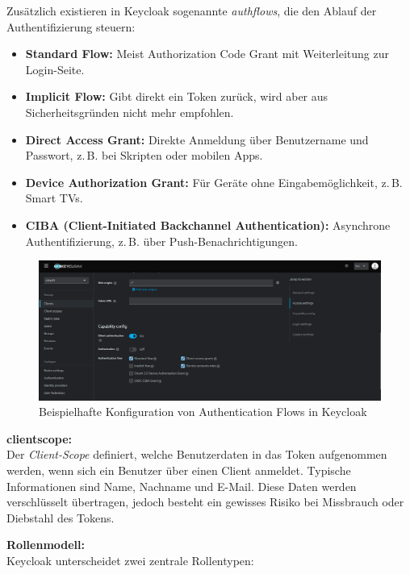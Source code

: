 \documentclass[a4paper,12pt]{article}
\begin{document}
	Zusätzlich existieren in Keycloak sogenannte \textit{\gls{authflow}s}, die den Ablauf der Authentifizierung steuern:
	
	\begin{itemize}
		\item \textbf{Standard Flow:} Meist Authorization Code Grant mit Weiterleitung zur Login-Seite.
		\item \textbf{Implicit Flow:} Gibt direkt ein Token zurück, wird aber aus Sicherheitsgründen nicht mehr empfohlen.
		\item \textbf{Direct Access Grant:} Direkte Anmeldung über Benutzername und Passwort, z.\,B. bei Skripten oder mobilen Apps.
		\item \textbf{Device Authorization Grant:} Für Geräte ohne Eingabemöglichkeit, z.\,B. Smart TVs.
		\item \textbf{CIBA (Client-Initiated Backchannel Authentication):} Asynchrone Authentifizierung, z.\,B. über Push-Benachrichtigungen.
	\end{itemize}
	
	\begin{figure}[H]
		\centering
		\includegraphics[width=0.9\linewidth]{screenshot013}
		\caption{Beispielhafte Konfiguration von Authentication Flows in Keycloak}
		\label{fig:screenshot013}
	\end{figure}
	
	\vspace{0.5em}
	\textbf{\gls{clientscope}:}\\
	Der \textit{Client-Scope} definiert, welche Benutzerdaten in das Token aufgenommen werden, wenn sich ein Benutzer über einen Client anmeldet. Typische Informationen sind Name, Nachname und E-Mail. Diese Daten werden verschlüsselt übertragen, jedoch besteht ein gewisses Risiko bei Missbrauch oder Diebstahl des Tokens.
	
	\vspace{0.5em}
	\textbf{Rollenmodell:}\\
	Keycloak unterscheidet zwei zentrale Rollentypen:
	
\end{document}
